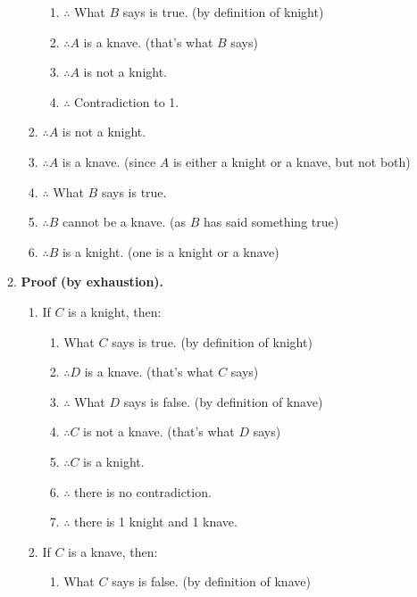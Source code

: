 \documentclass[12pt, a4paper]{article}
\begin{document}
\begin{enumerate}[Q\arabic*.]
\begin{enumerate}[(\alph*)]
\begin{enumerate}[label=\arabic*., itemsep=-2em]
\begin{enumerate}[label=1.\arabic*, itemsep=-2em]
              \item $\therefore$ What $B$ says is true. \hfill (by definition of knight)
              \item $\therefore A$ is a knave. \hfill (that's what $B$ says)
              \item $\therefore A$ is not a knight. 
              \item $\therefore$ Contradiction to 1.
          \end{enumerate}
          \item $\therefore A$ is not a knight.
          \item $\therefore A$ is a knave. \hfill (since $A$ is either a knight or a knave, but not both)
          \item $\therefore$ What $B$ says is true.
          \item $\therefore B$ cannot be a knave. \hfill (as $B$ has said something true)
          \item $\therefore B$ is a knight. \hfill (one is a knight or a knave)
      \end{enumerate}
      \item \textbf{Proof (by exhaustion).}
      \begin{enumerate}[label=\arabic*., itemsep=-2em]
          \item If $C$ is a knight, then:
          \begin{enumerate}[label=1.\arabic*, itemsep=-2em]
            \item What $C$ says is true. \hfill (by definition of knight)
            \item $\therefore D$ is a knave. \hfill (that's what $C$ says)
            \item $\therefore$ What $D$ says is false. \hfill (by definition of knave)
            \item $\therefore C$ is not a knave. \hfill (that's what $D$ says)
            \item $\therefore C$ is a knight.
            \item $\therefore$ there is no contradiction.
            \item $\therefore$ there is 1 knight and 1 knave.
          \end{enumerate}
          \item If $C$ is a knave, then:
          \begin{enumerate}[label=1.\arabic*, itemsep=-2em]
            \item What $C$ says is false. \hfill (by definition of knave)

\end{enumerate}
\end{enumerate}
\end{enumerate}
\end{enumerate}
\end{document}
